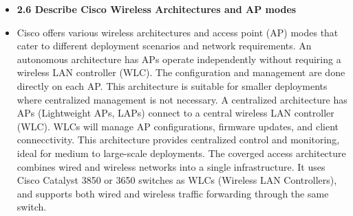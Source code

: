 \documentclass{article}
\begin{document}
\begin{itemize}
  \item \textbf{2.6 Describe Cisco Wireless Architectures and AP modes}
  	\item[] Cisco offers various wireless architectures and access point (AP) modes that cater to different deployment scenarios and network requirements. An autonomous architecture has APs operate independently without requiring a wireless LAN controller (WLC). The configuration and management are done directly on each AP. This architecture is suitable for smaller deployments where centralized management is not necessary. A centralized architecture has APs (Lightweight APs, LAPs) connect to a central wireless LAN controller (WLC). WLCs will manage AP configurations, firmware updates, and client connecctivity. This architecture provides centralized control and monitoring, ideal for medium to large-scale deployments. The coverged access architecture combines wired and wireless networks into a single infrastructure. It uses Cisco Catalyst 3850 or 3650 switches as WLCs (Wireless LAN Controllers), and supports both wired and wireless traffic forwarding through the same switch.

\end{itemize}
\end{document}
